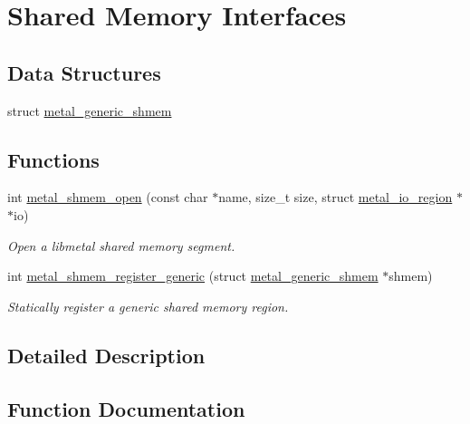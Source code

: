 \hypertarget{group__shmem}{}\section{Shared Memory Interfaces}
\label{group__shmem}
\subsection*{Data Structures}
\begin{DoxyCompactItemize}
\item 
struct \hyperlink{structmetal__generic__shmem}{metal\+\_\+generic\+\_\+shmem}
\end{DoxyCompactItemize}
\subsection*{Functions}
\begin{DoxyCompactItemize}
\item 
int \hyperlink{group__shmem_ga644f75b3abb4214f10db5384991bd052}{metal\+\_\+shmem\+\_\+open} (const char $\ast$name, size\+\_\+t size, struct \hyperlink{structmetal__io__region}{metal\+\_\+io\+\_\+region} $\ast$$\ast$io)
\begin{DoxyCompactList}\small\item\em Open a libmetal shared memory segment. \end{DoxyCompactList}\item 
int \hyperlink{group__shmem_ga9cf523f58d2114635593fe0c9fac0bbd}{metal\+\_\+shmem\+\_\+register\+\_\+generic} (struct \hyperlink{structmetal__generic__shmem}{metal\+\_\+generic\+\_\+shmem} $\ast$shmem)
\begin{DoxyCompactList}\small\item\em Statically register a generic shared memory region. \end{DoxyCompactList}\end{DoxyCompactItemize}


\subsection{Detailed Description}


\subsection{Function Documentation}
\mbox{\label{group__shmem_ga644f75b3abb4214f10db5384991bd052}} 
